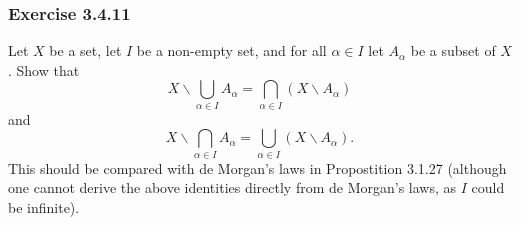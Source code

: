 \documentclass[12pt, letter]{article}
\begin{document}
\subsubsection*{Exercise 3.4.11}
Let $X$ be a set, let $I$ be a non-empty set, and for all $\alpha\in I$ let $A_\alpha$ be a subset of $X$. Show that 
\begin{equation*}
    X\backslash \bigcup_{\alpha\in I}A_\alpha=\bigcap_{\alpha\in I}(X\backslash A_\alpha)
\end{equation*}
and 
\begin{equation*}
    X\backslash \bigcap_{\alpha\in I}A_\alpha=\bigcup_{\alpha\in I}(X\backslash A_\alpha).
\end{equation*}
This should be compared with de Morgan's laws in Propostition 3.1.27 (although one cannot derive the above identities directly from de Morgan's laws, as $I$ could be infinite).
\end{document}

